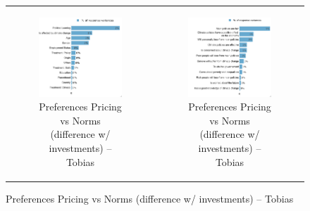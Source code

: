\documentclass{article}
\begin{document}
\begin{figure}[h!]
\begin{center}
	\begin{tabular}{cc}
		\begin{subfigure}{0.5\textwidth}
		\caption{Preferences Pricing vs Norms (difference w/ investments) -- Tobias}
			\includegraphics[width=\textwidth]{lmg_pref_pricing_norms_diff_V2_socio_non_standardized}
		\end{subfigure}&
		\begin{subfigure}{0.5\textwidth}
		\caption{Preferences Pricing vs Norms (difference w/ investments) -- Tobias}
			\includegraphics[width=\textwidth]{lmg_pref_pricing_norms_diff_V2_indices_non_standardized}
		\end{subfigure}\\
	\end{tabular}
\end{center}
\end{figure}
\end{document}
